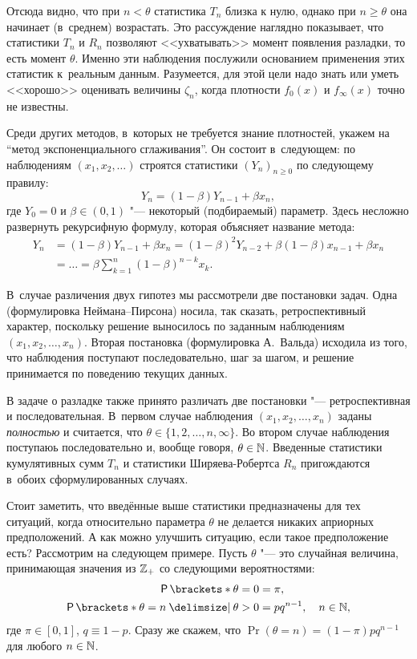 Отсюда видно, что при \(n < \theta\) статистика \(T_{n}\) близка к нулю, однако при \(n \geq \theta\) она начинает (в~среднем) возрастать. 
Это рассуждение наглядно показывает, что статистики \(T_{n}\) и \(R_{n}\) позволяют <<ухватывать>> момент появления разладки, то есть момент \(\theta\).
Именно эти наблюдения послужили основанием применения этих статистик к~реальным данным.
Разумеется, для этой цели надо знать или уметь <<хорошо>> оценивать величины \(\zeta_{n}\), когда плотности \(f_{0}(x)\) и \(f_{\infty}(x)\) точно не известны.

Среди других методов, в~которых не требуется знание плотностей, укажем на ``метод экспоненциального сглаживания''. 
Он состоит в~следующем: по наблюдениям \((x_{1}, x_{2}, \ldots)\) строятся статистики \((Y_{n})_{n \geq 0}\) по следующему правилу:
\[
	Y_{n} = (1 - \beta)Y_{n-1} + \beta x_{n},
\]
где \(Y_{0} = 0\) и \(\beta \in (0, 1)\) "--- некоторый (подбираемый) параметр. 
Здесь несложно развернуть рекурсифную формулу, которая объясняет название метода:
\begin{align*}
	Y_{n} 
	&= (1 - \beta)Y_{n-1} + \beta x_{n}
	= (1 - \beta)^{2}Y_{n - 2} + \beta(1 - \beta)x_{n - 1} + \beta x_{n} \\
	&= \ldots
	= \beta\sum_{k = 1}^{n}(1 - \beta)^{n - k}x_{k}.
\end{align*}

В~случае различения двух гипотез мы рассмотрели две постановки задач. 
Одна (формулировка Неймана--Пирсона) носила, так сказать, ретроспективный характер, поскольку решение выносилось по заданным наблюдениям \((x_{1}, x_{2}, \ldots, x_{n})\). 
Вторая постановка (формулировка А.~Вальда) исходила из того, что наблюдения поступают последовательно, шаг за шагом, и решение принимается по поведению текущих данных. 

В задаче о разладке также принято различать две постановки "--- ретроспективная и последовательная.
В~первом случае наблюдения \((x_{1}, x_{2}, \ldots, x_{n})\) заданы \emph{полностью} и считается, что \(\theta \in \{1, 2, \ldots, n, \infty\}\).
Во втором случае наблюдения поступаюь последовательно и, вообще говоря, \(\theta \in \mathbb{N}\).
Введенные статистики кумулятивных сумм \(T_{n}\) и статистики Ширяева-Робертса \(R_{n}\) пригождаются в~обоих сформулированных случаях.

Стоит заметить, что введённые выше статистики предназначены для тех ситуаций, когда относительно параметра \(\theta\) не делается никаких априорных предположений. 
А как можно улучшить ситуацию, если такое предположение есть?
Рассмотрим на следующем примере.
Пусть \(\theta\) "--- это случайная величина, принимающая значения из \(\mathbb{Z}_{+}\) со следующими вероятностями:
\begin{align*}
	\Pr{\theta = 0} 
	&= \pi, \\
	\Pr{\theta = n \given \theta > 0}
	&= pq^{n - 1},
	\quad
	n \in \N,
\end{align*}
где \(\pi \in [0, 1]\), \(q \equiv 1 - p\).
Сразу же скажем, что \(\Pr(\theta = n) = (1 - \pi)pq^{n - 1}\) для любого \(n \in \mathbb{N}\).

